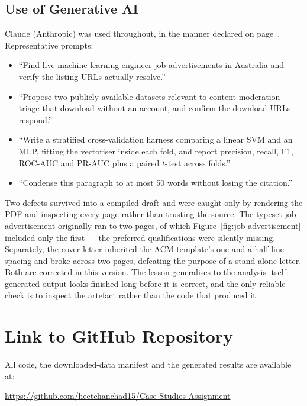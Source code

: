 \subsection{Use of Generative AI}

Claude (Anthropic) was used throughout, in the manner declared on
page~\pageref{sec:Data Analysis}. Representative prompts:

\begin{itemize}
    \item ``Find live machine learning engineer job advertisements in Australia and verify
    the listing URLs actually resolve.''
    \item ``Propose two publicly available datasets relevant to content-moderation triage
    that download without an account, and confirm the download URLs respond.''
    \item ``Write a stratified cross-validation harness comparing a linear SVM and an MLP,
    fitting the vectoriser inside each fold, and report precision, recall, F1, ROC-AUC and
    PR-AUC plus a paired $t$-test across folds.''
    \item ``Condense this paragraph to at most 50 words without losing the citation.''
\end{itemize}

Two defects survived into a compiled draft and were caught only by rendering the PDF and
inspecting every page rather than trusting the source. The typeset job advertisement
originally ran to two pages, of which Figure~\ref{fig:job advertisement} included only the
first --- the preferred qualifications were silently missing. Separately, the cover letter
inherited the ACM template's one-and-a-half line spacing and broke across two pages,
defeating the purpose of a stand-alone letter. Both are corrected in this version. The
lesson generalises to the analysis itself: generated output looks finished long before it
is correct, and the only reliable check is to inspect the artefact rather than the code
that produced it.

\section{Link to GitHub Repository}
\label{sec:Link to GitHub Repository}

All code, the downloaded-data manifest and the generated results are available at:

\url{https://github.com/heetchanchad15/Case-Studies-Assignment}

